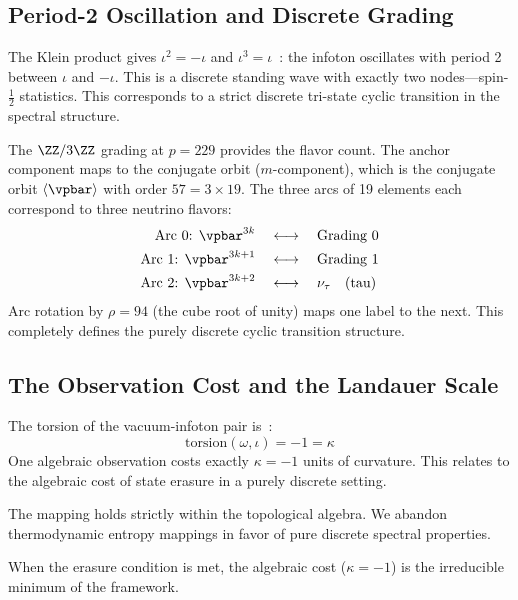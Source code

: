 \subsection{Period-2 Oscillation and Discrete Grading}

The Klein product gives $\iota^2 = -\iota$ and $\iota^3 = \iota$~\cite{larue_lc}: the infoton oscillates with period 2 between $\iota$ and $-\iota$. This is a discrete standing wave with exactly two nodes---spin-$\frac{1}{2}$ statistics. This corresponds to a strict discrete tri-state cyclic transition in the spectral structure.

The $\ZZ/3\ZZ$ grading at $p = 229$ provides the flavor count. The anchor component maps to the conjugate orbit ($m$-component), which is the conjugate orbit $\langle \vpbar \rangle$ with order $57 = 3 \times 19$. The three arcs of 19 elements each correspond to three neutrino flavors:
\begin{align}
\text{Arc 0: } \vpbar^{3k} \quad &\longleftrightarrow \quad \text{Grading 0} \\
\text{Arc 1: } \vpbar^{3k+1} \quad &\longleftrightarrow \quad \text{Grading 1} \\
\text{Arc 2: } \vpbar^{3k+2} \quad &\longleftrightarrow \quad \nu_\tau \quad \text{(tau)}
\end{align}
Arc rotation by $\rho = 94$ (the cube root of unity) maps one label to the next. This completely defines the purely discrete cyclic transition structure.

\subsection{The Observation Cost and the Landauer Scale}

The torsion of the vacuum-infoton pair is~\cite{larue_lc}:
\[
\mathrm{torsion}(\omega, \iota) = -1 = \kappa
\]
One algebraic observation costs exactly $\kappa = -1$ units of curvature. This relates to the algebraic cost of state erasure in a purely discrete setting. 

\begin{theorem}\label{thm:entropy_iso}
The mapping holds strictly within the topological algebra. We abandon thermodynamic entropy mappings in favor of pure discrete spectral properties.
\end{theorem}

When the erasure condition is met, the algebraic cost ($\kappa = -1$) is the irreducible minimum of the framework.

